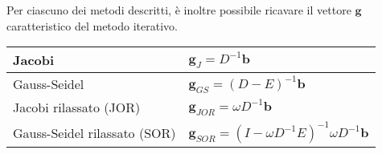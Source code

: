Per ciascuno dei metodi descritti, è inoltre possibile ricavare il vettore $\mathbf g$ caratteristico del metodo iterativo.

\begin{table}[H]
  \def\arraystretch{1.5}
  \begin{tabular}{|l|l|}
    \hline
    Jacobi                       & $\mathbf g_{J} =D^{-1}\mathbf b$ \\ \hline
    Gauss-Seidel                 & $\mathbf g_{GS} =( D-E)^{-1}\mathbf b$ \\ \hline
    Jacobi rilassato (JOR)       & $\mathbf g_{JOR} =\omega D^{-1} \mathbf{b}$ \\ \hline
    Gauss-Seidel rilassato (SOR) & $\mathbf g_{SOR} =\left( I-\omega D^{-1} E\right)^{-1}\omega D^{-1}\mathbf b$ \hspace{2cm} \\ \hline
  \end{tabular}
\end{table}


